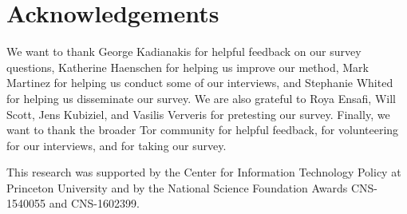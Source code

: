 \section*{Acknowledgements}
We want to thank George Kadianakis for helpful feedback on our survey
questions, Katherine Haenschen for helping us improve our method, Mark Martinez
for helping us conduct some of our interviews, and Stephanie Whited for helping
us disseminate our survey.  We are also grateful to Roya Ensafi, Will Scott,
Jens Kubiziel, and Vasilis Ververis for pretesting our survey.  Finally, we
want to thank the broader Tor community for helpful feedback, for volunteering
for our interviews, and for taking our survey.

This research was supported by the Center for Information Technology Policy at
Princeton University and by the National Science Foundation Awards CNS-1540055
and CNS-1602399.
